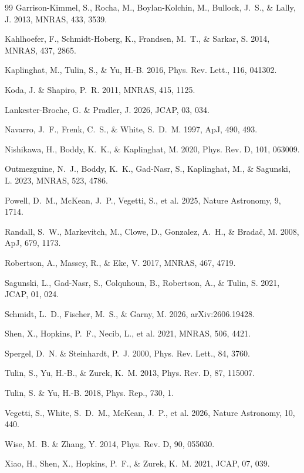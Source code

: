 \documentclass[12pt]{iopart}
\begin{document}
\begin{thebibliography}{99}
Garrison-Kimmel, S., Rocha, M., Boylan-Kolchin, M., Bullock, J.~S.,
\& Lally, J. 2013, MNRAS, 433, 3539.

Kahlhoefer, F., Schmidt-Hoberg, K., Frandsen, M.~T., \& Sarkar, S. 2014,
MNRAS, 437, 2865.

Kaplinghat, M., Tulin, S., \& Yu, H.-B. 2016,
Phys. Rev. Lett., 116, 041302.

Koda, J. \& Shapiro, P.~R. 2011, MNRAS, 415, 1125.

Lankester-Broche, G. \& Pradler, J. 2026, JCAP, 03, 034.

Navarro, J.~F., Frenk, C.~S., \& White, S.~D.~M. 1997, ApJ, 490, 493.

Nishikawa, H., Boddy, K.~K., \& Kaplinghat, M. 2020,
Phys. Rev. D, 101, 063009.

Outmezguine, N.~J., Boddy, K.~K., Gad-Nasr, S., Kaplinghat, M., \&
Sagunski, L. 2023, MNRAS, 523, 4786.

Powell, D.~M., McKean, J.~P., Vegetti, S., et al. 2025,
Nature Astronomy, 9, 1714.

Randall, S.~W., Markevitch, M., Clowe, D., Gonzalez, A.~H., \& Brada\v{c},
M. 2008, ApJ, 679, 1173.

Robertson, A., Massey, R., \& Eke, V. 2017, MNRAS, 467, 4719.

Sagunski, L., Gad-Nasr, S., Colquhoun, B., Robertson, A., \& Tulin, S. 2021,
JCAP, 01, 024.

Schmidt, L.~D., Fischer, M.~S., \& Garny, M. 2026,
arXiv:2606.19428.

Shen, X., Hopkins, P.~F., Necib, L., et al. 2021, MNRAS, 506, 4421.

Spergel, D.~N. \& Steinhardt, P.~J. 2000, Phys. Rev. Lett., 84, 3760.

Tulin, S., Yu, H.-B., \& Zurek, K.~M. 2013, Phys. Rev. D, 87, 115007.

Tulin, S. \& Yu, H.-B. 2018, Phys. Rep., 730, 1.

Vegetti, S., White, S.~D.~M., McKean, J.~P., et al. 2026,
Nature Astronomy, 10, 440.

Wise, M.~B. \& Zhang, Y. 2014, Phys. Rev. D, 90, 055030.

Xiao, H., Shen, X., Hopkins, P.~F., \& Zurek, K.~M. 2021, JCAP, 07, 039.
\end{thebibliography}
\end{document}
